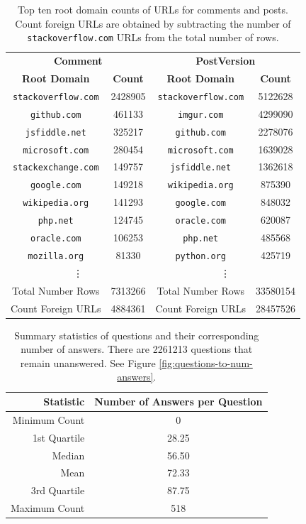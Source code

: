 \documentclass[a4paper,11pt, notitlepage]{report}
\theoremstyle{definition}
\numberwithin{equation}{section}		%
\begin{document}
\begin{table}[ht]
    \centering
    \begin{tabular}{cc|cc}
    \hline \multicolumn{2}{c}{\textbf{Comment}} & \multicolumn{2}{c}{\textbf{PostVersion}} \\
    \textbf{Root Domain} & \textbf{Count} & \textbf{Root Domain} & \textbf{Count} \\ \hline
    \texttt{stackoverflow.com} & 2428905 & \texttt{stackoverflow.com} & 5122628 \\
    \texttt{github.com} & 461133 & \texttt{imgur.com} & 4299090 \\
    \texttt{jsfiddle.net} & 325217 & \texttt{github.com} & 2278076 \\
    \texttt{microsoft.com} & 280454 & \texttt{microsoft.com} & 1639028\\
    \texttt{stackexchange.com} & 149757 & \texttt{jsfiddle.net} & 1362618 \\
    \texttt{google.com} & 149218 & \texttt{wikipedia.org} & 875390 \\
    \texttt{wikipedia.org} & 141293 & \texttt{google.com} & 848032 \\
    \texttt{php.net} & 124745 & \texttt{oracle.com} & 620087 \\
    \texttt{oracle.com} & 106253 & \texttt{php.net} & 485568 \\
    \texttt{mozilla.org} & 81330 & \texttt{python.org} & 425719 \\ 
    \multicolumn{2}{c}{\vdots} & \multicolumn{2}{c}{\vdots} \\ \hline
    Total Number Rows & 7313266 & Total Number Rows & 33580154 \\
    Count Foreign URLs & 4884361 & Count Foreign URLs & 28457526 \\
    \end{tabular}
    \caption{Top ten root domain counts of URLs for comments and posts. Count foreign URLs are obtained by subtracting the number of \texttt{stackoverflow.com} URLs from the total number of rows.}
    \label{tab:foreign-urls}
\end{table}

\begin{table}[ht]
\centering
\begin{tabular}{rc}
\hline
\textbf{Statistic} & \textbf{Number of Answers per Question} \\ \hline
Minimum Count   & 0 \\
1st Quartile    & 28.25 \\
Median          & 56.50 \\
Mean            & 72.33 \\
3rd Quartile    & 87.75 \\
Maximum Count   & 518   \\
\end{tabular}
\caption{Summary statistics of questions and their corresponding number of answers. There are 2261213 questions that remain unanswered. See Figure \ref{fig:questions-to-num-answers}.}
\label{table:questions-to-num-answers}
\end{table}
\end{document}
